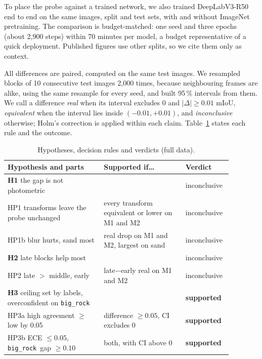\documentclass[conference]{IEEEtran}
\newcommand{\bigrock}{\texttt{big\_rock}}
\begin{document}
To place the probe against a trained network, we also trained DeepLabV3-R50 end to end on the same images, split and test sets, with and without ImageNet pretraining. The comparison is budget-matched: one seed and three epochs (about 2{,}900 steps) within 70 minutes per model, a budget representative of a quick deployment. Published figures use other splits, so we cite them only as context.

All differences are paired, computed on the same test images. We resampled blocks of 10 consecutive test images 2{,}000 times, because neighbouring frames are alike, using the same resample for every seed, and built 95\,\% intervals from them. We call a difference \emph{real} when its interval excludes 0 and $|\Delta|\ge 0.01$ mIoU, \emph{equivalent} when the interval lies inside $(-0.01,+0.01)$, and \emph{inconclusive} otherwise; Holm's correction is applied within each claim. Table~\ref{tab:hyp} states each rule and the outcome.

\begin{table}[t]\centering\footnotesize
\caption{Hypotheses, decision rules and verdicts (full data).}\label{tab:hyp}
\begin{tabular}{@{}p{0.40\linewidth}p{0.34\linewidth}p{0.14\linewidth}@{}}\toprule
Hypothesis and parts & Supported if\ldots & Verdict\\\midrule
\textbf{H1} the gap is not photometric & & inconclusive\\
\quad HP1 transforms leave the probe unchanged & every transform equivalent or lower on M1 and M2 & inconclusive\\
\quad HP1b blur hurts, sand most & real drop on M1 and M2, largest on sand & inconclusive\\
\textbf{H2} late blocks help most & & inconclusive\\
\quad HP2 late $>$ middle, early & late$-$early real on M1 and M2 & inconclusive\\
\textbf{H3} ceiling set by labels, overconfident on \bigrock & & \textbf{supported}\\
\quad HP3a high agreement $\ge$ low by 0.05 & difference $\ge0.05$, CI excludes 0 & \textbf{supported}\\
\quad HP3b ECE $\le0.05$, \bigrock\ gap $\ge0.10$ & both, with CI above 0 & \textbf{supported}\\\bottomrule
\end{tabular}\end{table}
\end{document}
